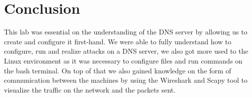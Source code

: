 \documentclass{article}
\begin{document}
\hbox{}

\hbox{}

\pagebreak
\section{Conclusion}

This lab was essential on the understanding of the DNS server by allowing us to create and configure it first-hand.
We were able to fully understand how to configure, run and realize attacks on a DNS server, we also got more used to the Linux environment as it was necessary to configure files and run commands on the bash terminal.
On top of that we also gained knowledge on the form of communication between the machines by using the Wireshark and Scapy tool to visualize the traffic on the network and the packets sent.
\end{document}
